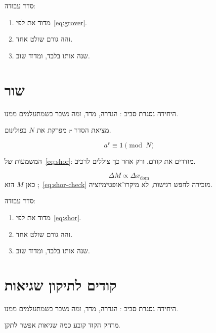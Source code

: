 סדר עבודה:
\begin{enumerate}
\item[(\textbf{א})] מדוד את  לפי~\eqref{eq:grover}.
\item[(\textbf{ב})] זהה גורם שולט אחד.
\item[(\textbf{ג})] שנה אותו בלבד, ומדוד שוב.
\end{enumerate}

\chapter{שור}
\label{ch:shor}

היחידה נסגרת סביב : הגדרה, מדד, ומה נשבר כשמתעלמים ממנו.

\begin{keybox}[frametitle={רעיון מפתח — שור}]
מציאת הסדר $r$ מפרקת את $N$ בפולינום.
\end{keybox}

\begin{equation}
\label{eq:shor}
a^r \equiv 1 \pmod N
\end{equation}

המשמעות של~\eqref{eq:shor}: מודדים את  קודם, ורק אחר כך צוללים לרכיב.

\begin{equation}
\label{eq:shor-check}
\Delta M \propto \Delta x_{\mathrm{dom}}
\end{equation}
כאן $M$ הוא ;~\eqref{eq:shor-check} מזכירה לחפש רגישות, לא מיקרו־אופטימיזציה.

סדר עבודה:
\begin{enumerate}
\item[(\textbf{א})] מדוד את  לפי~\eqref{eq:shor}.
\item[(\textbf{ב})] זהה גורם שולט אחד.
\item[(\textbf{ג})] שנה אותו בלבד, ומדוד שוב.
\end{enumerate}

\chapter{קודים לתיקון שגיאות}
\label{ch:qec}

היחידה נסגרת סביב : הגדרה, מדד, ומה נשבר כשמתעלמים ממנו.

\begin{defbox}[frametitle={הגדרה — קודים לתיקון שגיאות}]
מרחק הקוד קובע כמה שגיאות אפשר לתקן.
\end{defbox}

